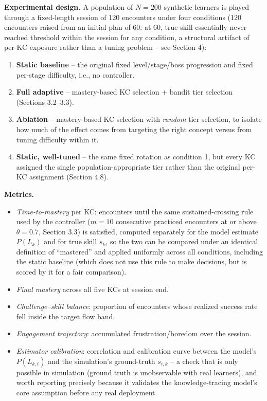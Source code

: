 \documentclass[11pt]{article}
\begin{document}
\textbf{Experimental design.} A population of $N{=}200$ synthetic learners is played through a fixed-length session of 120 encounters under four conditions (120 encounters raised from an initial plan of 60: at 60, true skill essentially never reached threshold within the session for any condition, a structural artifact of per-KC exposure rather than a tuning problem -- see Section 4):
\begin{enumerate}
\item \textbf{Static baseline} -- the original fixed level/stage/boss progression and fixed per-stage difficulty, i.e., no controller.
\item \textbf{Full adaptive} -- mastery-based KC selection + bandit tier selection (Sections 3.2--3.3).
\item \textbf{Ablation} -- mastery-based KC selection with \textit{random} tier selection, to isolate how much of the effect comes from targeting the right concept versus from tuning difficulty within it.
\item \textbf{Static, well-tuned} -- the same fixed rotation as condition 1, but every KC assigned the single population-appropriate tier rather than the original per-KC assignment (Section 4.8).
\end{enumerate}

\textbf{Metrics.}
\begin{itemize}
\item \textit{Time-to-mastery} per KC: encounters until the same sustained-crossing rule used by the controller ($m{=}10$ consecutive practiced encounters at or above $\theta{=}0.7$, Section 3.3) is satisfied, computed separately for the model estimate $P(L_k)$ and for true skill $s_k$, so the two can be compared under an identical definition of ``mastered'' and applied uniformly across all conditions, including the static baseline (which does not use this rule to make decisions, but is scored by it for a fair comparison).
\item \textit{Final mastery} across all five KCs at session end.
\item \textit{Challenge--skill balance}: proportion of encounters whose realized success rate fell inside the target flow band.
\item \textit{Engagement trajectory}: accumulated frustration/boredom over the session.
\item \textit{Estimator calibration}: correlation and calibration curve between the model's $P(L_{k,t})$ and the simulation's ground-truth $s_{i,k}$ -- a check that is only possible in simulation (ground truth is unobservable with real learners), and worth reporting precisely because it validates the knowledge-tracing model's core assumption before any real deployment.
\end{itemize}
\end{document}
